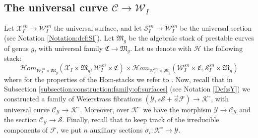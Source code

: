 \documentclass[11pt]{amsart}
\newcommand{\cE}{\mathcal{W}}
\newcommand{\sC}{\mathscr{C}}
\newcommand{\sF}{\mathscr{F}}
\newcommand{\kC}{\mathfrak{C}}
\newcommand{\kM}{\mathfrak{M}}
\newcommand{\sH}{\mathscr{H}}
\newcommand{\sS}{\mathscr{S}}
\newcommand{\sX}{\mathscr{X}}
\newcommand{\Kg}{\mathcal{K}}
\newcommand{\sY}{\mathscr{Y}}
\theoremstyle{definition}
\begin{document}
\subsection{The universal curve $\sC \to \cE_I$}

Let $\sX_I^{sn} \to \cE_I^{sn}$ the universal surface, and let $\sS_I^{sn} \to \cE_I^{sn}$ be the universal section (see Notation \ref{Notation:def:SI}).
Let $\mathfrak{M}_g$ be the algebraic stack of prestable curves of genus $g$, with universal family $\mathfrak{C} \to \mathfrak{M}_g$.
Let us denote with $\sH$ the following stack:
$$\sH om_{\cE_I^{sn} \times \kM_g}(\sX_I \times \kM_g, \cE_I^{sn} \times \kC) \times \sH om_{\cE_I^{sn}\times \kM_g}(\cE_I^{sn} \times \kC,\sS_I^{sn} \times \kM_g)$$
where for the properties of the Hom-stacks we refer to \cite{Homstack}.
Now, recall that in Subsection
\ref{subsection:construction:family:of:surfaces} (see Notation \ref{Def:sY}) we constructed a family of Weierstrass fibrations $(\sY,s\sS+\vec{a}\sF) \to \Kg^\circ$, with
universal curve $\sC_{\sY} \to \Kg^\circ$. 
Moreover, over $\Kg^\circ$ we have the morphism $\sY \to \sC_{\sY}$ and the section $\sC_{\sY} \to \sS$. Finally, recall that to keep track of the irreducible components of $\sF$, we put $n$ auxiliary sections $\sigma_i:\Kg^\circ \to \sY$.
\end{document}
